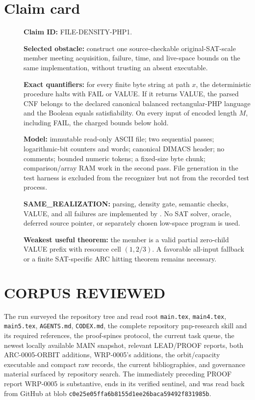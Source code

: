 \documentclass[11pt]{article}
\begin{document}
\section{Claim card}
\begin{description}
\item[] \textbf{Claim ID:} FILE-DENSITY-PHP1.
\item[] \textbf{Selected obstacle:} construct one source-checkable
original-SAT-scale member meeting acquisition, failure, time, and live-space
bounds on the same implementation, without trusting an absent executable.
\item[] \textbf{Exact quantifiers:} for every finite byte string at path $x$,
the deterministic procedure halts with FAIL or VALUE.  If it returns VALUE,
the parsed CNF belongs to the declared canonical balanced rectangular-PHP
language and the Boolean equals satisfiability.  On every input of encoded
length $M$, including FAIL, the charged bounds below hold.
\item[] \textbf{Model:} immutable read-only ASCII file; two sequential passes;
logarithmic-bit counters and words; canonical DIMACS header; no comments;
bounded numeric tokens; a fixed-size byte chunk; comparison/array RAM work in
the second pass.  File generation in the test harness is excluded from the
recognizer but not from the recorded test process.
\item[] \textbf{SAME\_REALIZATION:} parsing, density gate, semantic checks,
VALUE, and all failures are implemented by
.  No SAT solver,
oracle, deferred source pointer, or separately chosen low-space program is
used.
\item[] \textbf{Weakest useful theorem:} the member is a valid partial
zero-child VALUE prefix with resource cell $(1,2/3)$.  A favorable all-input
fallback or a finite SAT-specific ARC hitting theorem remains necessary.
\end{description}

\section{CORPUS REVIEWED}
The run surveyed the repository tree and read root \texttt{main.tex},
\texttt{main4.tex}, \texttt{main5.tex}, \texttt{AGENTS.md}, \texttt{CODEX.md},
the complete repository pnp-research skill and its required references, the
proof-spines protocol, the current task queue, the newest locally available
MAIN snapshot, relevant LEAD/PROOF reports, both ARC-0005-ORBIT additions,
WRP-0005's additions, the orbit/capacity executable and compact raw records,
the current bibliographies, and governance material surfaced by repository
search.  The immediately preceding PROOF report WRP-0005 is substantive,
ends in its verified sentinel, and was read back from GitHub at blob
\texttt{c0e25e05ffa6b8155d1ee26baca59492f831985b}.
\end{document}
